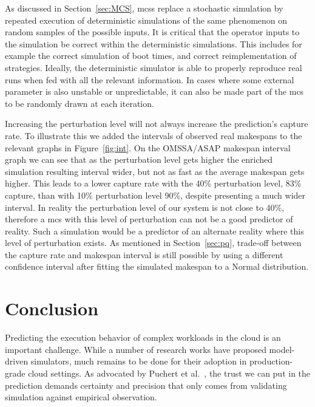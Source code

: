 \documentclass[10pt,conference,compsocconf]{IEEEtran}
\begin{document}
As discussed in Section~\ref{sec:MCS}, \aclp{mcs} replace a stochastic
simulation by repeated execution of deterministic simulations of the same
phenomenon on random samples of the possible inputs. It is critical that the
operator inputs to the simulation be correct within the deterministic simulations.
This includes for example the correct simulation of boot times, and correct
reimplementation of strategies. Ideally, the deterministic simulator is able to
properly reproduce real runs when fed with all the relevant information. In cases
where some external parameter is also unstable or unpredictable, it can also be
made part of the \ac{mcs} to be randomly drawn at each iteration.

Increasing the perturbation level will not always increase the prediction's
capture rate. To illustrate this we added the intervals of observed real
makespans to the relevant graphs in Figure~\ref{fig:int}. On the OMSSA/ASAP
makespan interval graph we can see that as the perturbation level gets higher
the enriched simulation resulting interval wider, but not as fast as the
average makespan gets higher. This leads to a lower capture rate with the 40\%
perturbation level, 83\% capture, than with 10\% perturbation level 90\%,
despite presenting a much wider interval. In reality the perturbation level of
our system is not close to 40\%, therefore a \ac{mcs} with this level of
perturbation can not be a good predictor of reality. Such a simulation would be
a predictor of an alternate reality where this level of perturbation exists. As
mentioned in Section~\ref{sec:pq}, trade-off between the capture rate and
makespan interval is still possible by using a different confidence
interval after fitting the simulated makespan to a Normal distribution.

\section{Conclusion}

Predicting  the execution  behavior  of complex  workloads in  the  cloud is  an
important challenge. While a number of research works have proposed model-driven
simulators, much remains to be done for their adoption in production-grade cloud
settings. As  advocated by Puchert  et al.~\cite{PucherGWK15}, the trust  we can
put in  the prediction  demands certainty  and precision  that only  comes from
validating simulation against empirical observation.
\end{document}

